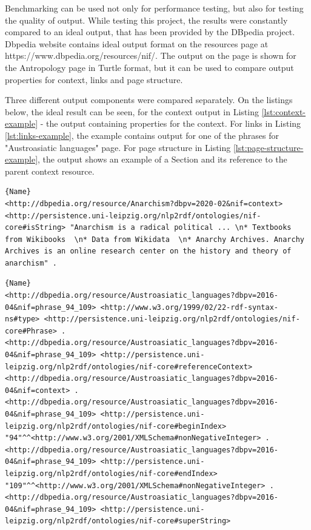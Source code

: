 \documentclass[thesis=M,english,hidelinks]{FITthesis}[2019/12/23]
\begin{document}
Benchmarking can be used not only for performance testing, but also for testing the quality of output. While testing this project, the results were constantly compared to an ideal output, that has been provided by the DBpedia project\cite{dbpedia_url}. Dbpedia website contains ideal output format on  the resources page at https://www.dbpedia.org/resources/nif/. The output on the page is shown for the Antropology page in Turtle format, but it can be used to compare output properties for context, links and page structure.

Three different output components were compared separately. On the listings below, the ideal result can be seen, for the context output in Listing \ref{lst:context-example} - the output containing properties for the context. For links in Listing \ref{lst:links-example}, the example contains output for one of the phrases for "Austroasiatic languages" page. For page structure in Listing \ref{lst:page-structure-example}, the output shows an example of a Section and its reference to the parent context resource.

\begin{lstlisting}[caption=Exemplary result for NIF Context,frame=tlrb,  label = {lst:context-example}]{Name}
<http://dbpedia.org/resource/Anarchism?dbpv=2020-02&nif=context> <http://persistence.uni-leipzig.org/nlp2rdf/ontologies/nif-core#isString> "Anarchism is a radical political ... \n* Textbooks from Wikibooks  \n* Data from Wikidata  \n* Anarchy Archives. Anarchy Archives is an online research center on the history and theory of anarchism" .
\end{lstlisting}

\begin{lstlisting}[caption=Exemplary result for NIF Links,frame=tlrb,  label = {lst:links-example}]{Name}
<http://dbpedia.org/resource/Austroasiatic_languages?dbpv=2016-04&nif=phrase_94_109> <http://www.w3.org/1999/02/22-rdf-syntax-ns#type> <http://persistence.uni-leipzig.org/nlp2rdf/ontologies/nif-core#Phrase> .
<http://dbpedia.org/resource/Austroasiatic_languages?dbpv=2016-04&nif=phrase_94_109> <http://persistence.uni-leipzig.org/nlp2rdf/ontologies/nif-core#referenceContext> <http://dbpedia.org/resource/Austroasiatic_languages?dbpv=2016-04&nif=context> .
<http://dbpedia.org/resource/Austroasiatic_languages?dbpv=2016-04&nif=phrase_94_109> <http://persistence.uni-leipzig.org/nlp2rdf/ontologies/nif-core#beginIndex> "94"^^<http://www.w3.org/2001/XMLSchema#nonNegativeInteger> .
<http://dbpedia.org/resource/Austroasiatic_languages?dbpv=2016-04&nif=phrase_94_109> <http://persistence.uni-leipzig.org/nlp2rdf/ontologies/nif-core#endIndex> "109"^^<http://www.w3.org/2001/XMLSchema#nonNegativeInteger> .
<http://dbpedia.org/resource/Austroasiatic_languages?dbpv=2016-04&nif=phrase_94_109> <http://persistence.uni-leipzig.org/nlp2rdf/ontologies/nif-core#superString>
\end{lstlisting}
\end{document}
